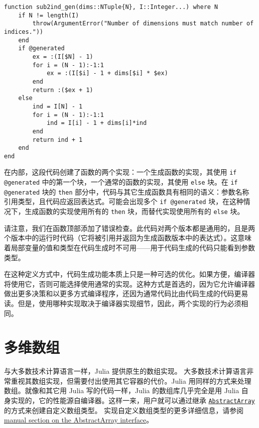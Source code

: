 \begin{verbatim}
function sub2ind_gen(dims::NTuple{N}, I::Integer...) where N
    if N != length(I)
        throw(ArgumentError("Number of dimensions must match number of indices."))
    end
    if @generated
        ex = :(I[$N] - 1)
        for i = (N - 1):-1:1
            ex = :(I[$i] - 1 + dims[$i] * $ex)
        end
        return :($ex + 1)
    else
        ind = I[N] - 1
        for i = (N - 1):-1:1
            ind = I[i] - 1 + dims[i]*ind
        end
        return ind + 1
    end
end
\end{verbatim}



在内部，这段代码创建了函数的两个实现：一个生成函数的实现，其使用 \texttt{if @generated} 中的第一个块，一个通常的函数的实现，其使用 \texttt{else} 块。在 \texttt{if @generated} 块的 \texttt{then} 部分中，代码与其它生成函数具有相同的语义：参数名称引用类型，且代码应返回表达式。可能会出现多个 \texttt{if @generated} 块，在这种情况下，生成函数的实现使用所有的 \texttt{then} 块，而替代实现使用所有的 \texttt{else} 块。



请注意，我们在函数顶部添加了错误检查。此代码对两个版本都是通用的，且是两个版本中的运行时代码（它将被引用并返回为生成函数版本中的表达式）。这意味着局部变量的值和类型在代码生成时不可用——用于代码生成的代码只能看到参数类型。



在这种定义方式中，代码生成功能本质上只是一种可选的优化。如果方便，编译器将使用它，否则可能选择使用通常的实现。这种方式是首选的，因为它允许编译器做出更多决策和以更多方式编译程序，还因为通常代码比由代码生成的代码更易读。但是，使用哪种实现取决于编译器实现细节，因此，两个实现的行为必须相同。



\hypertarget{12380164357355707963}{}


\chapter{多维数组}



与大多数技术计算语言一样，Julia 提供原生的数组实现。 大多数技术计算语言非常重视其数组实现，但需要付出使用其它容器的代价。Julia 用同样的方式来处理数组。就像和其它用 Julia 写的代码一样，Julia 的数组库几乎完全是用 Julia 自身实现的，它的性能源自编译器。这样一来，用户就可以通过继承 \hyperlink{6514416309183787338}{\texttt{AbstractArray}} 的方式来创建自定义数组类型。 实现自定义数组类型的更多详细信息，请参阅\hyperlink{9718377734213742156}{manual section on the AbstractArray interface}。



